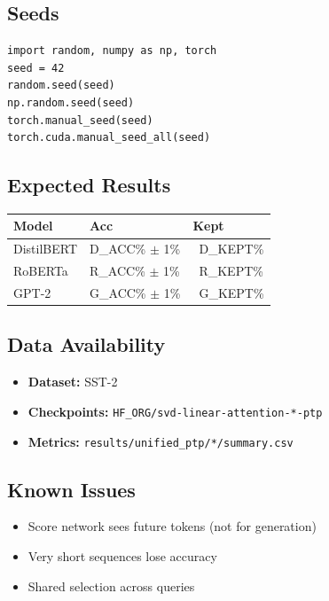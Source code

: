 \subsection{Seeds}

\begin{lstlisting}
import random, numpy as np, torch
seed = 42
random.seed(seed)
np.random.seed(seed)
torch.manual_seed(seed)
torch.cuda.manual_seed_all(seed)
\end{lstlisting}

\subsection{Expected Results}

\begin{table}[H]
\centering
\small
\begin{tabular}{lll}
\toprule
\textbf{Model} & \textbf{Acc} & \textbf{Kept} \\
\midrule
DistilBERT & {{D\_ACC}}\% $\pm$ 1\% & ~{{D\_KEPT}}\% \\
RoBERTa & {{R\_ACC}}\% $\pm$ 1\% & ~{{R\_KEPT}}\% \\
GPT-2 & {{G\_ACC}}\% $\pm$ 1\% & ~{{G\_KEPT}}\% \\
\bottomrule
\end{tabular}
\end{table}

\subsection{Data Availability}

\begin{itemize}
\item \textbf{Dataset:} SST-2
\item \textbf{Checkpoints:} \texttt{{{HF\_ORG}}/svd-linear-attention-*-ptp}
\item \textbf{Metrics:} \texttt{results/unified\_ptp/*/summary.csv}

\end{itemize}
\subsection{Known Issues}

\begin{itemize}
\item Score network sees future tokens (not for generation)
\item Very short sequences lose accuracy
\item Shared selection across queries

\end{itemize}
